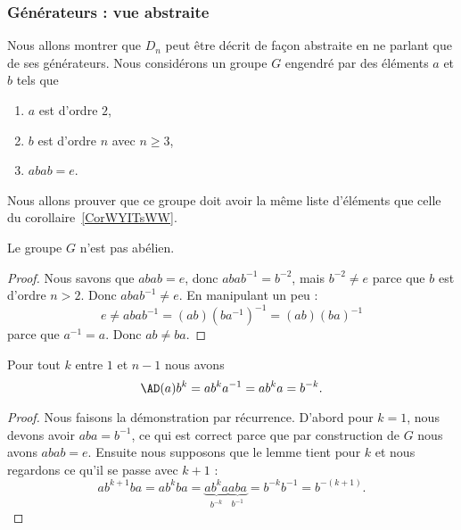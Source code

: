 \subsubsection{Générateurs : vue abstraite}

\begin{normaltext}      \label{NORMooCCUEooRRENed}
    Nous allons montrer que \( D_n\) peut être décrit de façon abstraite en ne parlant que de ses générateurs. Nous considérons un groupe \( G\) engendré par des éléments \( a\) et \( b\) tels que
    \begin{enumerate}
        \item
            \( a\) est d'ordre \( 2\),
        \item
            \( b\) est d'ordre \( n\) avec \( n\geq 3\),
        \item
            \( abab=e\).
    \end{enumerate}
    Nous allons prouver que ce groupe doit avoir la même liste d'éléments que celle du corollaire~\ref{CorWYITsWW}.
\end{normaltext}

\begin{proposition}
    Le groupe \( G\) n'est pas abélien.
\end{proposition}

\begin{proof}
    Nous savons que \( abab=e\), donc \( abab^{-1}=b^{-2}\), mais \( b^{-2}\neq e\) parce que \( b\) est d'ordre \( n>2\). Donc \( abab^{-1}\neq e\). En manipulant un peu :
    \begin{equation}
        e\neq abab^{-1}=(ab)(ba^{-1})^{-1}=(ab)(ba)^{-1}
    \end{equation}
    parce que \( a^{-1}=a\). Donc \( ab\neq ba\).
\end{proof}

\begin{lemma}        \label{LemKKXdqdL}
    Pour tout \( k\) entre \( 1\) et \( n-1\) nous avons
    \begin{equation}
        \AD(a)b^k=ab^ka^{-1}=ab^ka=b^{-k}.
    \end{equation}
\end{lemma}

\begin{proof}
    Nous faisons la démonstration par récurrence. D'abord pour \( k=1\), nous devons avoir \( aba=b^{-1}\), ce qui est correct parce que par construction de \( G\) nous avons \( abab=e\). Ensuite nous supposons que le lemme tient pour \( k\) et nous regardons ce qu'il se passe avec \( k+1\) :
    \begin{equation}
            ab^{k+1}ba=ab^kba=\underbrace{ab^ka}_{b^{-k}}\underbrace{aba}_{b^{-1}}=b^{-k}b^{-1}=b^{-(k+1)}.
    \end{equation}
\end{proof}

